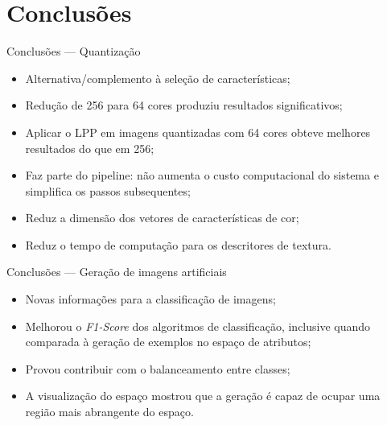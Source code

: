 \documentclass[10pt]{beamer}
\begin{document}
\section{Conclusões}
\begin{frame}{Conclusões --- Quantização}
  \setlength\leftmargini{1em}
  \begin{itemize}
    \item Alternativa/complemento à seleção de características;
    \item Redução de 256 para 64 cores produziu resultados significativos;
    \item Aplicar o LPP em imagens quantizadas com 64 cores obteve melhores resultados do que em 256;
    \item Faz parte do pipeline: não aumenta o custo computacional do sistema e simplifica os passos subsequentes;
    \item Reduz a dimensão dos vetores de características de cor;
    \item Reduz o tempo de computação para os descritores de textura.
  \end{itemize}
\end{frame}
\begin{frame}{Conclusões --- Geração de imagens artificiais}
  \setlength\leftmargini{1em}
  \begin{itemize}
    \item Novas informações para a classificação de imagens;
    \item Melhorou o \textit{F1-Score} dos algoritmos de classificação, inclusive quando comparada à geração de exemplos no espaço de atributos;
    \item Provou contribuir com o balanceamento entre classes;
    \item A visualização do espaço mostrou que a geração é capaz de ocupar uma região mais abrangente do espaço.
  \end{itemize}
\end{frame}
\end{document}
